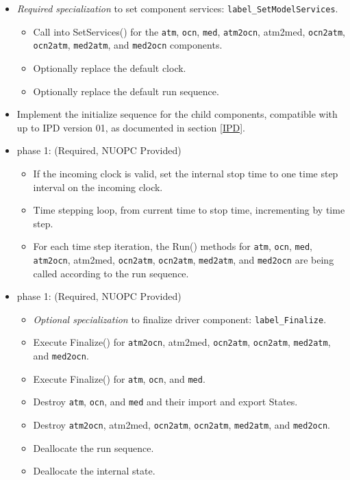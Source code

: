 \begin{itemize}
\begin{itemize}
  \item {\it Required specialization} to set component services: {\tt label\_SetModelServices}. 
  \begin{itemize}
    \item Call into SetServices() for the {\tt atm}, {\tt ocn}, {\tt med}, {\tt atm2ocn}, {atm2med}, {\tt ocn2atm}, {\tt ocn2atm}, {\tt med2atm}, and {\tt med2ocn} components.
    \item Optionally replace the default clock. 
    \item Optionally replace the default run sequence.
  \end{itemize}
  \item Implement the initialize sequence for the child components, compatible with up to IPD version 01, as documented in section \ref{IPD}.
  \end{itemize}  
\end{itemize}

\begin{itemize}
\item phase 1: ({\sc Required, NUOPC Provided})
  \begin{itemize}
  \item If the incoming clock is valid, set the internal stop time to one time step interval on the incoming clock.
  \item Time stepping loop, from current time to stop time, incrementing by time step.
  \item For each time step iteration, the Run() methods for {\tt atm}, {\tt ocn}, {\tt med}, {\tt atm2ocn}, {atm2med}, {\tt ocn2atm}, {\tt ocn2atm}, {\tt med2atm}, and {\tt med2ocn} are being called according to the run sequence.
  \end{itemize}    
\end{itemize}

\begin{itemize}
\item phase 1: ({\sc Required, NUOPC Provided})
  \begin{itemize}
  \item {\it Optional specialization} to finalize driver component: {\tt label\_Finalize}.
  \item Execute Finalize() for {\tt atm2ocn}, {atm2med}, {\tt ocn2atm}, {\tt ocn2atm}, {\tt med2atm}, and {\tt med2ocn}.
  \item Execute Finalize() for {\tt atm}, {\tt ocn}, and {\tt med}.
  \item Destroy {\tt atm}, {\tt ocn}, and {\tt med} and their import and export States.
  \item Destroy {\tt atm2ocn}, {atm2med}, {\tt ocn2atm}, {\tt ocn2atm}, {\tt med2atm}, and {\tt med2ocn}.
  \item Deallocate the run sequence.
  \item Deallocate the internal state.
  \end{itemize}      
\end{itemize}

